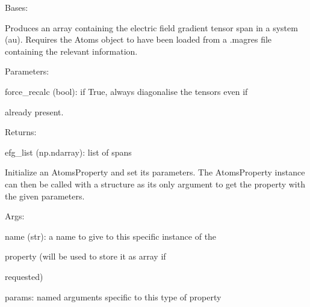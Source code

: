 \documentclass[letterpaper,10pt,english]{sphinxmanual}
\begin{document}
\begin{fulllineitems}
\label{doctree/soprano.properties.nmr.efg:soprano.properties.nmr.efg.EFGSpan}
Bases: {\hyperref[doctree/soprano.properties.atomsproperty:soprano.properties.atomsproperty.AtomsProperty]{\emph{}}}

Produces an array containing the electric field gradient tensor span
in a system (au).
Requires the Atoms object to have been loaded from a .magres file
containing the relevant information.

\begin{DUlineblock}{0em}
\item[] Parameters:
\item[]
\begin{DUlineblock}{\DUlineblockindent}
\item[] force\_recalc (bool): if True, always diagonalise the tensors even if
\item[]
\begin{DUlineblock}{\DUlineblockindent}
\item[] already present.
\end{DUlineblock}
\end{DUlineblock}
\end{DUlineblock}

\begin{DUlineblock}{0em}
\item[] Returns:
\item[]
\begin{DUlineblock}{\DUlineblockindent}
\item[] efg\_list (np.ndarray): list of spans
\end{DUlineblock}
\end{DUlineblock}

Initialize an AtomsProperty and set its parameters.
The AtomsProperty instance can then be called with a structure as its
only argument to get the property with the given parameters.

\begin{DUlineblock}{0em}
\item[] Args:
\item[]
\begin{DUlineblock}{\DUlineblockindent}
\item[] name (str): a name to give to this specific instance of the
\item[]
\begin{DUlineblock}{\DUlineblockindent}
\item[] property (will be used to store it as array if
\item[] requested)
\end{DUlineblock}
\item[] params: named arguments specific to this type of property
\end{DUlineblock}
\end{DUlineblock}


\end{fulllineitems}
\end{document}
